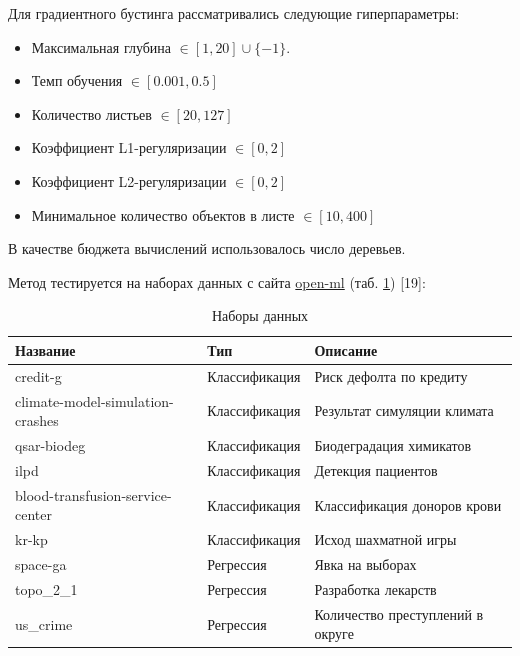 \documentclass[a4paper,12pt]{article}
\begin{document}
Для градиентного бустинга рассматривались следующие гиперпараметры:
\begin{itemize}
    \item Максимальная глубина $\in [1, 20] \cup \{-1\}.$
    \item Темп обучения $\in [0.001, 0.5]$
    \item Количество листьев $\in [20, 127]$
    \item Коэффициент L1-регуляризации $\in [0, 2]$
    \item Коэффициент L2-регуляризации $\in [0, 2]$
    \item Минимальное количество объектов в листе $\in [10, 400]$
    
\end{itemize}
В качестве бюджета вычислений использовалось число деревьев.

Метод тестируется на наборах данных с сайта \href{https://www.openml.org/}{open-ml} (таб. \ref{tab:datasets}) [19]:
\begin{table}[h]
\centering
\begin{tabular}{|l|l|l|}
\hline
Название                         & Тип           & Описание                                  \\ \hline
credit-g                         & Классификация & Риск дефолта по кредиту                   \\ \hline
climate-model-simulation-crashes & Классификация & Результат симуляции климата \\ \hline
qsar-biodeg                      & Классификация & Биодеградация химикатов                   \\ \hline
ilpd                             & Классификация & Детекция пациентов                        \\ \hline
blood-transfusion-service-center & Классификация & Классификация доноров крови               \\ \hline
kr-kp                            & Классификация & Исход шахматной игры                      \\ \hline
space-ga                         & Регрессия     & Явка на выборах                           \\ \hline
topo\_2\_1                         & Регрессия     & Разработка лекарств                       \\ \hline
us\_crime                         & Регрессия     & Количество преступлений в округе          \\ \hline
\end{tabular}
\caption{Наборы данных}
\label{tab:datasets}
\end{table}
\end{document}
